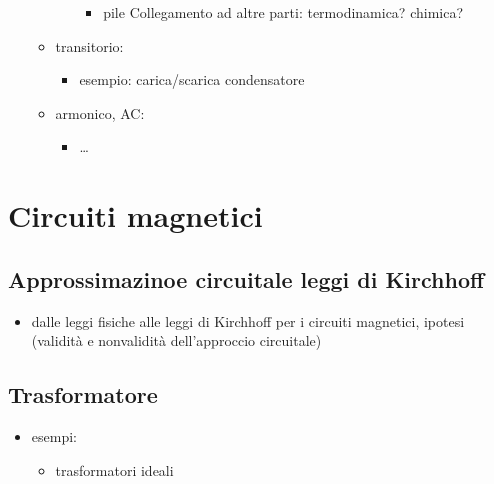 \documentclass[letterpaper,10pt,italian]{jupyterBook}
\begin{document}
\begin{itemize}
\begin{itemize}
\begin{itemize}
\begin{itemize}
\item {} 
\sphinxAtStartPar
pile  Collegamento ad altre parti: termodinamica? chimica?

\end{itemize}

\end{itemize}

\item {} 
\sphinxAtStartPar
transitorio:
\begin{itemize}
\item {} 
\sphinxAtStartPar
esempio: carica/scarica condensatore

\end{itemize}

\item {} 
\sphinxAtStartPar
armonico, AC:
\begin{itemize}
\item {} 
\sphinxAtStartPar
…

\end{itemize}

\end{itemize}

\end{itemize}

\sphinxstepscope


\section{Circuiti magnetici}
\label{\detokenize{ch/electromagnetism/circuits-magnetic:circuiti-magnetici}}\label{\detokenize{ch/electromagnetism/circuits-magnetic:physics-hs-electromagnetism-circuits-magnetic}}\label{\detokenize{ch/electromagnetism/circuits-magnetic::doc}}

\subsection{Approssimazinoe circuitale \sphinxhyphen{} leggi di Kirchhoff}
\label{\detokenize{ch/electromagnetism/circuits-magnetic:approssimazinoe-circuitale-leggi-di-kirchhoff}}\begin{itemize}
\item {} 
\sphinxAtStartPar
dalle leggi fisiche alle leggi di Kirchhoff per i circuiti magnetici, ipotesi (validità e non\sphinxhyphen{}validità dell’approccio circuitale)

\end{itemize}


\subsection{Trasformatore}
\label{\detokenize{ch/electromagnetism/circuits-magnetic:trasformatore}}\begin{itemize}
\item {} 
\sphinxAtStartPar
esempi:
\begin{itemize}
\item {} 
\sphinxAtStartPar
trasformatori ideali

\end{itemize}

\end{itemize}
\end{document}
